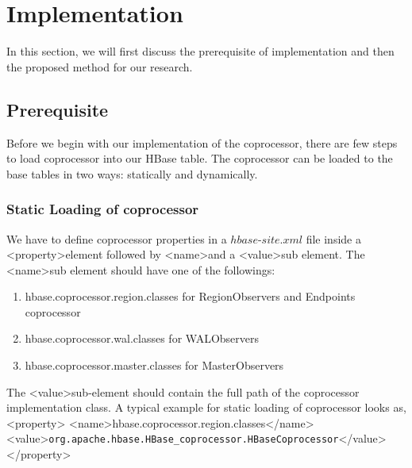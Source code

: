 \documentclass[11pt,a4paper,bibtotoc,idxtotoc,headsepline,footsepline,footexclude,BCOR12mm,DIV13]{scrbook}
\begin{document}
\newpage
\chapter{Implementation}
In this section, we will first discuss the prerequisite of implementation and then the proposed method for our research.

\section{Prerequisite}
Before we begin with our implementation of the coprocessor, there are few steps to load coprocessor into our HBase table. The coprocessor can be loaded to the base tables in two ways: statically and dynamically\cite{loading:coprocessors}. 

\subsection{Static Loading of coprocessor}
We have to define coprocessor properties in a $hbase$-$site.xml$ file inside a \textless property\textgreater \space element followed by \textless name\textgreater \space and a \textless value\textgreater \space sub element. The \textless name\textgreater \space sub element should have one of the followings\cite{hbase:site}:

\begin{enumerate}
    \item hbase.coprocessor.region.classes for RegionObservers and Endpoints coprocessor
    \item hbase.coprocessor.wal.classes for WALObservers
    \item hbase.coprocessor.master.classes for MasterObservers
    
\end{enumerate}

The \textless value\textgreater \space sub-element should contain the full path of the coprocessor implementation class. A typical example for static loading of coprocessor looks as,\newline \newline \textless property\textgreater \newline
\textless name\textgreater hbase.coprocessor.region.classes\textless /name\textgreater \newline
\textless value\textgreater \texttt{org.apache.hbase.HBase\_coprocessor.HBaseCoprocessor}\textless /value\textgreater \newline
\textless /property\textgreater \newline
\end{document}
